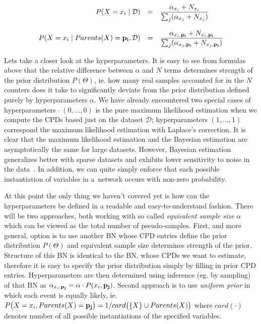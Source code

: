 \documentclass[english,cover]{fitthesis} %
\newcommand{\term}[1]{\emph{#1}}           %
\newcommand{\vars}[1]{{\bold{#1}}}         %
\begin{document}
\begin{equation*}
    \begin{array}{rcl}
    P(X = x_i \mid \mathcal{D}) &
     = &
     \displaystyle\frac
        {\alpha_{x_i} + N_{x_i}}
        {\sum_j (\alpha_{x_j} + N_{x_j})}\\
        & & \\
    P(X = x_i \mid Parents(X) = \vars{p_i}, \mathcal{D}) &
     = &
     \displaystyle\frac
        {\alpha_{x_i, \vars{p_i}} + N_{x_i, \vars{p_i}}}
        {\sum_j (\alpha_{x_j, \vars{p_i}} + N_{x_j, \vars{p_i}})}
    \end{array}
\end{equation*}

Lets take a closer look at the hyperparameters. It is easy to see from formulas above that the relative difference between $\alpha$ and $N$ terms determines strength of the prior distribution $P(\Theta)$, ie. how many real samples accounted for in the $N$ counters does it take to significantly deviate from the prior distribution defined purely by hyperparameters $\alpha$.
We have already encountered two special cases of hyperparameters\,--\,$(0,\dots,0)$ is the pure maximum likelihood estimation when we compute the CPDs based just on the dataset $\mathcal{D}$; hyperparameters $(1,\dots,1)$ correspond the maximum likelihood estimation with Laplace's correction.
It is clear that the maximum likelihood estimation and the Bayesian estimation are asymptotically the same for large datasets. However, Bayesian estimation generalizes better with sparse datasets and exhibits lower sensitivity to noise in the data~\cite[p.~749]{pgm}. In addition, we can quite simply enforce that each possible instantiation of variables in a~network occurs with non-zero probability.

At this point the only thing we haven't covered yet is how can the hyperparameters be defined in a readable and easy-to-understand fashion. There will be two approaches, both working with so called \term{equivalent sample size} $\alpha$ which can be viewed as the total number of pseudo-samples. First, and more general, option is to use another BN whose CPD entries define the prior distribution $P(\Theta)$ and equivalent sample size determines strength of the prior. Structure of this BN is identical to the BN, whose CPDs we want to estimate, therefore it is easy to specify the prior distribution simply by filling in prior CPD entries. Hyperparameters are then determined using inference (eg. by sampling) of that BN as $\alpha_{x_i,\vars{p_j}} = \alpha \cdot P(x_i, \vars{p_j})$. Second approach is to use \term{uniform prior} in which each event is equally likely, ie. $P\bigl(X = x_i, Parents(X) = \vars{p_j}\bigr) = 1 / card\bigl(\lbrace X \rbrace \cup Parents(X)\bigr)$ where $card(\cdot)$ denotes number of all possible instantiations of the specified variables.
\end{document}
